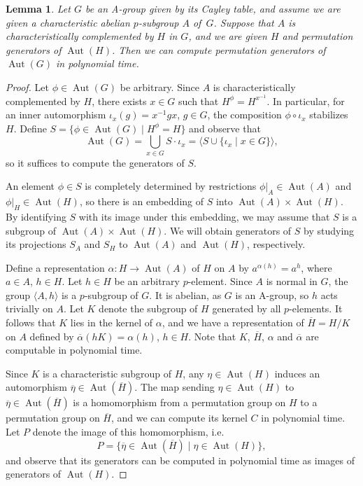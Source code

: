 \documentclass{article}
\newtheorem{lemma}[theorem]{Lemma}
\DeclareMathOperator{\Aut}{Aut}
\begin{document}
\begin{lemma}\label{lred}
	Let \( G \) be an A-group given by its Cayley table, and assume we are given a characteristic
	abelian \( p \)-subgroup \( A \) of~\( G \). Suppose that \( A \) is characteristically complemented by \( H \) in \( G \),
	and we are given \( H \) and permutation generators of \( \Aut(H) \).
	Then we can compute permutation generators of \( \Aut(G) \) in polynomial time.
\end{lemma}
\begin{proof}
	Let \( \phi \in \Aut(G) \) be arbitrary. Since \( A \) is characteristically complemented by \( H \), there exists
	\( x \in G \) such that \( H^\phi = H^{x^{-1}} \). In particular, for an inner automorphism \( \iota_x(g) = x^{-1}gx \), \( g \in G \),
	the composition \( \phi \circ \iota_x \) stabilizes \( H \). Define \( S = \{ \phi \in \Aut(G) \mid H^\phi = H \} \)
	and observe that
	\[ \Aut(G) = \bigcup_{x \in G} S \cdot \iota_x = \langle S \cup \{ \iota_x \mid x \in G \} \rangle, \]
	so it suffices to compute the generators of \( S \).

	An element \( \phi \in S \) is completely determined by restrictions \( \phi|_A \in \Aut(A) \)
	and \( \phi|_H \in \Aut(H) \), so there is an embedding of \( S \) into \( \Aut(A) \times \Aut(H) \).
	By identifying \( S \) with its image under this embedding, we may assume that \( S \) is a subgroup of \( \Aut(A) \times \Aut(H) \).
	We will obtain generators of \( S \) by studying its projections \( S_A \) and \( S_H \) to \( \Aut(A) \) and \( \Aut(H) \), respectively.

	Define a representation \( \alpha : H \to \Aut(A) \) of \( H \) on \( A \) by
	\( a^{\alpha(h)} = a^h \), where \( a \in A \), \( h \in H \).
	Let \( h \in H \) be an arbitrary \( p \)-element. Since \( A \) is normal in \( G \),
	the group \( \langle A, h \rangle \) is a \( p \)-subgroup of \( G \). It is abelian, as \( G \) is an A-group,
	so \( h \) acts trivially on \( A \). Let \( K \) denote the subgroup of \( H \) generated by all \( p \)-elements.
	It follows that \( K \) lies in the kernel of \( \alpha \), and we have a representation of \( \overline{H} = H/K \)
	on \( A \) defined by \( \overline{\alpha}(hK) = \alpha(h) \), \( h \in H \).
	Note that \( K \), \( \overline{H} \), \( \alpha \) and \( \overline{\alpha} \) are computable in polynomial time.

	Since \( K \) is a characteristic subgroup of \( H \), any \( \eta \in \Aut(H) \) induces an automorphism
	\( \overline{\eta} \in \Aut(\overline{H}) \). The map sending \( \eta \in \Aut(H) \) to \( \overline{\eta} \in \Aut(\overline{H}) \)
	is a homomorphism from a permutation group on \( H \) to a permutation group on \( \overline{H} \), and
	we can compute its kernel \( C \) in polynomial time. Let \( P \) denote the image of this homomorphism, i.e.
	\[ P = \{ \overline{\eta} \in \Aut(\overline{H}) \mid \eta \in \Aut(H) \}, \]
	and observe that its generators can be computed in polynomial time as images of generators of \( \Aut(H) \).


\end{proof}
\end{document}
